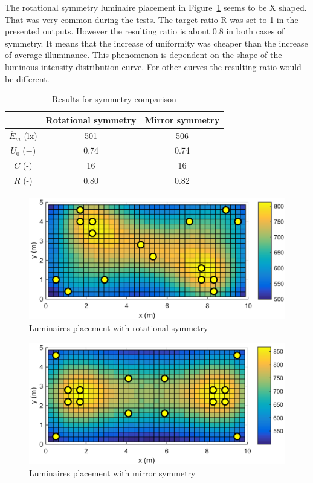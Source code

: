 The rotational symmetry luminaire placement in Figure~\ref{fig:V010_S0} seems to be X shaped. That was very common during the tests. The target ratio R was set to 1 in the presented outputs. However the resulting ratio is about 0.8 in both cases of symmetry. It means that the increase of uniformity was cheaper than the increase of average illuminance. This phenomenon is dependent on the shape of the luminous intensity distribution curve. For other curves the resulting ratio would be different.

\begin{table}[tb]
	\renewcommand{\arraystretch}{1.3}
	\caption{Results for symmetry comparison}
 	\label{tab:symmetry}
	\centering
  \begin{tabular}{| c | c | c |}
    \hline
    & \textbf{Rotational symmetry} & \textbf{Mirror symmetry} \\
    \hline
    $\overline{E}_{m}$ (lx) & 501 & 506 \\
    \hline
		$U_0$ ($-$)& 0.74 & 0.74 \\
    \hline
		$C$ (-) & 16 & 16 \\
	\hline
		$R$ (-) & 0.80 & 0.82 \\
  \hline
  \end{tabular}
\end{table}
\begin{figure}[tb]
  \centering
  \includegraphics[width=\columnwidth]{MSTR_SLB_4x18W_5G4_Fit2_V010_S0}
  \caption{Luminaires placement with rotational symmetry}
  \label{fig:V010_S0}
\end{figure}
\begin{figure}[tb]
  \centering
  \includegraphics[width=\columnwidth]{../Vysledky/MSTR_SLB_4x18W_5G4_Fit2_V010_S1}
  \caption{Luminaires placement with mirror symmetry}
  \label{fig:V010_S1}
\end{figure}


